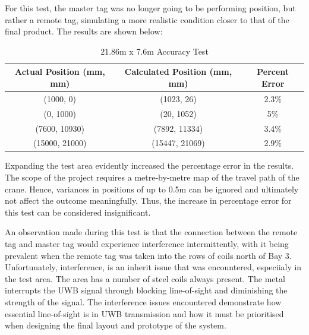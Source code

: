 \documentclass[12pt, a4paper]{article}
\begin{document}
For this test, the master tag was no longer going to be performing position, but rather a remote tag, simulating a more realistic condition closer to that
of the final product. The results are shown below:
\begin{center}
    \begin{table}[h]
        \begin{adjustbox}{width=1\textwidth, center=\textwidth}
            \small
            \begin{tabular}{||c c c||}
                \hline
                Actual Position (mm, mm) & Calculated Position (mm, mm) & Percent Error \\
                \hline
                (1000, 0) & (1023, 26) & 2.3\% \\
                \hline
                (0, 1000) & (20, 1052) & 5\% \\
                \hline
                (7600, 10930) & (7892, 11334) & 3.4\% \\
                \hline
                (15000, 21000) & (15447, 21069) & 2.9\% \\
                \hline
            \end{tabular}
        \end{adjustbox}
        \caption{21.86m x 7.6m Accuracy Test}
        \label{tab:res2}
    \end{table}
\end{center}
Expanding the test area evidently increased the percentage error in the results. The scope of the project requires a metre-by-metre map
of the travel path of the crane. Hence, variances in positions of up to 0.5m can be ignored and ultimately not affect the outcome
meaningfully. Thus, the increase in percentage error for this test can be considered insignificant.

An observation made during this test is that the connection between the remote tag and master tag would experience interference
intermittently, with it being prevalent when the remote tag was taken into the rows of coils north of Bay 3. Unfortunately, interference,
is an inherit issue that was encountered, especiialy in the test area. The area has a number of steel coils always present. The metal interrupts
the UWB signal through blocking line-of-sight and diminishing the strength of the signal. The interference issues encountered demonstrate
how essential line-of-sight is in UWB transmission and how it must be prioritised when designing the final layout and prototype 
of the system.
\end{document}
